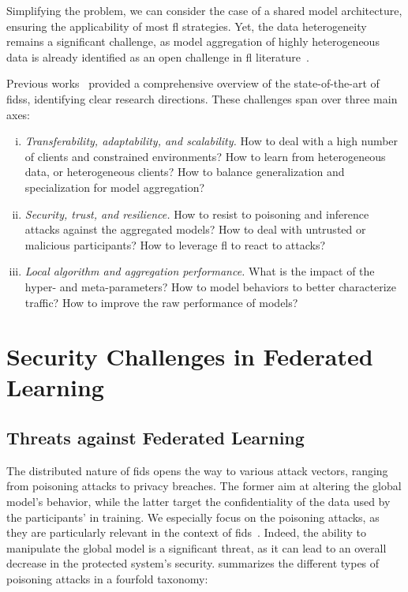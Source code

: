 \documentclass[conference]{IEEEtran}
\begin{document}
Simplifying the problem, we can consider the case of a shared model architecture, ensuring the applicability of most \gls{fl} strategies.
Yet, the data heterogeneity remains a significant challenge, as model aggregation of highly heterogeneous data is already identified as an open challenge in \gls{fl} literature~\cite{zhu_federated_2021}.

Previous works~\cite{lavaur_evolution_2022} provided a comprehensive overview of the state-of-the-art of \glspl{fids}, identifying clear research directions.
These challenges span over three main axes:

\begin{enumerate}[(i)]
    \item \emph{Transferability, adaptability, and scalability.}
    How to deal with a high number of clients and constrained environments?
    How to learn from heterogeneous data, or heterogeneous clients?
    How to balance generalization and specialization for model aggregation?

    \item \emph{Security, trust, and resilience.}
    How to resist to poisoning and inference attacks against the aggregated models?
    How to deal with untrusted or malicious participants?
    How to leverage \gls{fl} to react to attacks?

    \item \emph{Local algorithm and aggregation performance.}
    What is the impact of the hyper- and meta-parameters?
    How to model behaviors to better characterize traffic?
    How to improve the raw performance of models?
\end{enumerate}


\section{Security Challenges in Federated Learning} %
\label{sec:threats}

\subsection{Threats against Federated Learning}

The distributed nature of \gls{fids} opens the way to various attack vectors, ranging from poisoning attacks to privacy breaches.
The former aim at altering the global model's behavior, while the latter target the confidentiality of the data used by the participants' in training.
We especially focus on the poisoning attacks, as they are particularly relevant in the context of \gls{fids}~\cite{lavaur_icdcs_demo}.
Indeed, the ability to manipulate the global model is a significant threat, as it can lead to an overall decrease in the protected system's security.
\citet{rodriguez-barroso_survey_2023} summarizes the different types of poisoning attacks in a fourfold taxonomy:
\end{document}
